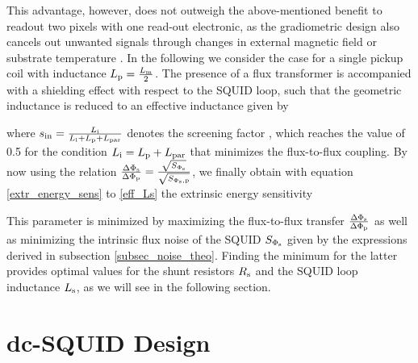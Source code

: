 
This advantage, however, does not outweigh the above-mentioned benefit to readout two pixels with one read-out electronic, as the gradiometric design also cancels out unwanted signals through changes in external magnetic field or substrate temperature \cite{Mantegazzini2021}. In the following we consider the case for a single pickup coil with inductance $L_{\rm p}=\frac{L_{\rm m}}{2}$. The presence of a flux transformer is accompanied with a shielding effect with respect to the SQUID loop, such that the geometric inductance is reduced to an effective inductance given by \cite{Gross2016} 


where $s_{\rm in}=\frac{L_{\rm i}}{L_{\rm i} + L_{\rm p} + L_{\rm par}}$ denotes the screening factor \cite{Clarke2004}, which reaches the value of 0.5 for the condition $L_{\rm i}=L_{\rm p}+L_{\rm par}$ that minimizes the flux-to-flux coupling. By now using the relation $\frac{\Delta\Phi_{\rm s}}{\Delta\Phi_{\rm p}}=\frac{\sqrt{S_{\rm \Phi_s}}}{\sqrt{S_{\rm \Phi_s,p}}}$, we finally obtain with equation \ref{extr_energy_sens} to \ref{eff_Ls} the extrinsic energy sensitivity \cite{Knuutila1988}


This parameter is minimized by maximizing the flux-to-flux transfer $\frac{\Delta\Phi_{\rm s}}{\Delta\Phi_{\rm p}}$ as well as minimizing the intrinsic flux noise of the SQUID $S_{\rm \Phi_s}$ given by the expressions derived in subsection \ref{subsec_noise_theo}. Finding the minimum for the latter provides optimal values for the shunt resistors $R_{\rm s}$ and the SQUID loop inductance $L_{\rm s}$, as we will see in the following section.  

\section{dc-SQUID Design} \label{sec_SQUIDdesign}

